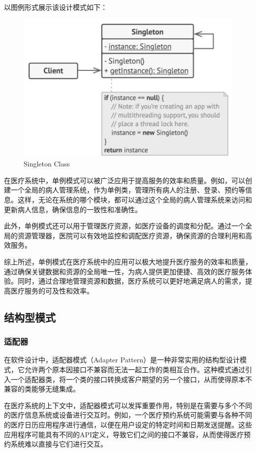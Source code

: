 以图例形式展示该设计模式如下：
\begin{figure}[htbp]
	\centering
	\includegraphics[width=0.5\textheight]{figures/05.png}
	\caption{Singleton Class}
\end{figure}
在医疗系统中，单例模式可以被广泛应用于提高服务的效率和质量。例如，可以创建一个全局的病人管理系统，作为单例类，管理所有病人的注册、登录、预约等信息。这样，无论在系统的哪个模块，都可以通过这个全局的病人管理系统来访问和更新病人信息，确保信息的一致性和准确性。

此外，单例模式还可以用于管理医疗资源，如医疗设备的调度和分配。通过一个全局的资源管理器，医院可以有效地监控和调配医疗资源，确保资源的合理利用和高效服务。

综上所述，单例模式在医疗系统中的应用可以极大地提升医疗服务的效率和质量，通过确保关键数据和资源的全局唯一性，为病人提供更加便捷、高效的医疗服务体验。同时，通过合理地管理资源和数据，医疗系统可以更好地满足病人的需求，提高医疗服务的可及性和效率。


\subsection{结构型模式}
\subsubsection{适配器}
在软件设计中，适配器模式（Adapter Pattern）是一种非常实用的结构型设计模式，它允许两个原本因接口不兼容而无法一起工作的类相互合作。这种模式通过引入一个适配器类，将一个类的接口转换成客户期望的另一个接口，从而使得原本不兼容的类能够无缝集成。

在医疗系统的上下文中，适配器模式可以发挥重要作用，特别是在需要与多个不同的医疗信息系统或设备进行交互时。例如，一个医疗预约系统可能需要与各种不同的医疗日历应用程序进行通信，以便在用户设定的特定时间和日期发送提醒。这些应用程序可能具有不同的API定义，导致它们之间的接口不兼容，从而使得医疗预约系统难以直接与它们进行交互。

